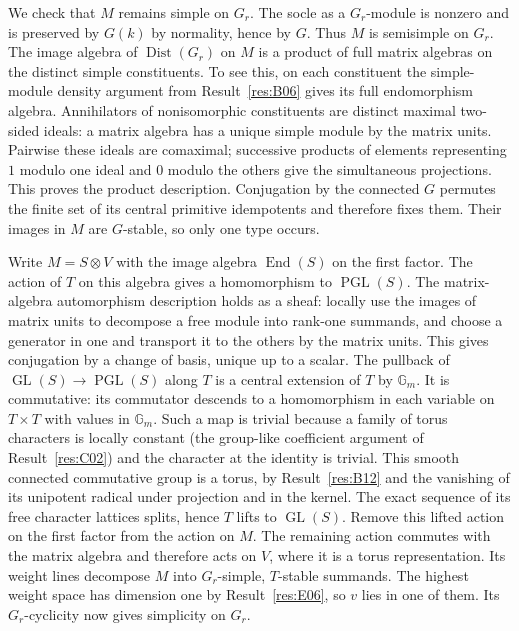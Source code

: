 \documentclass[11pt,a4paper,openany,oneside]{book}
\theoremstyle{resultstyle}
\theoremstyle{definition}
\numberwithin{equation}{chapter}
\newcommand{\Gm}{\mathbb{G}_m}
\begin{document}
We check that \(M\) remains simple on \(G_r\).
The socle as a \(G_r\)-module is nonzero and is preserved
by \(G(k)\) by normality, hence by \(G\). Thus \(M\) is
semisimple on \(G_r\).
The image algebra of \(\operatorname{Dist}(G_r)\) on
\(M\) is a product of full matrix algebras on the distinct
simple constituents. To see this, on each constituent
the simple-module density argument from
Result~\ref{res:B06} gives its full endomorphism algebra.
Annihilators of nonisomorphic constituents are distinct
maximal two-sided ideals: a matrix algebra has a unique
simple module by the matrix units. Pairwise these ideals
are comaximal; successive products of elements representing
\(1\) modulo one ideal and \(0\) modulo the others give
the simultaneous projections. This proves the product
description. Conjugation by the connected \(G\) permutes
the finite set of its central primitive idempotents and
therefore fixes them. Their images in \(M\) are \(G\)-stable,
so only one type occurs.

Write \(M=S\otimes V\) with the image algebra
\(\operatorname{End}(S)\) on the first factor. The action
of \(T\) on this algebra gives a homomorphism to
\(\operatorname{PGL}(S)\). The matrix-algebra automorphism
description holds as a sheaf: locally use the images of
matrix units to decompose a free module into rank-one
summands, and choose a generator in one and transport it
to the others by the matrix units. This gives conjugation
by a change of basis, unique up to a scalar.
The pullback of \(\operatorname{GL}(S)\to
\operatorname{PGL}(S)\) along \(T\) is a central extension
of \(T\) by \(\Gm\). It is commutative: its commutator
descends to a homomorphism in each variable on
\(T\times T\) with values in \(\Gm\). Such a map is
trivial because a family of torus characters is locally
constant (the group-like coefficient argument of
Result~\ref{res:C02}) and the character at the identity
is trivial. This smooth connected commutative group
is a torus, by Result~\ref{res:B12} and the vanishing
of its unipotent radical under projection and in the
kernel. The exact sequence of its free character
lattices splits, hence \(T\) lifts to
\(\operatorname{GL}(S)\). Remove this lifted action
on the first factor from the action on \(M\).
The remaining action commutes with the matrix algebra
and therefore acts on \(V\), where it is a torus
representation. Its weight lines decompose \(M\)
into \(G_r\)-simple, \(T\)-stable summands.
The highest weight space has dimension one by
Result~\ref{res:E06}, so \(v\) lies in one of them.
Its \(G_r\)-cyclicity now gives simplicity on \(G_r\).
\end{document}
